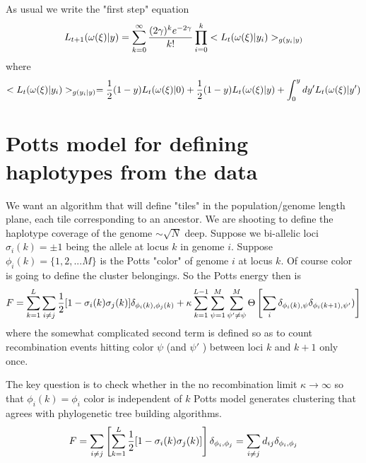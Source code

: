 \documentclass{article}
\begin{document}
As usual we write the "first step" equation
\begin{eqnarray}
L_{t+1}(\omega (\xi ) | y )=\sum_{k=0}^{\infty} {(2\gamma )^k e^{-2\gamma} \over k!} \prod_{i=0}^k <L_{t}(\omega (\xi ) | y_i )>_{g(y_i |y)}
\end{eqnarray}
where 
\begin{eqnarray}
 <L_{t}(\omega (\xi ) | y_i )>_{g(y_i |y)}={1 \over 2}(1-y) L_{t}(\omega (\xi ) | 0 )+{1 \over 2}(1-y) L_{t}(\omega (\xi ) | y )+\int_0^y dy' L_{t}(\omega (\xi ) | y' )
\end{eqnarray}

\section*{Potts model for defining haplotypes from the data}

We want an algorithm that will define "tiles" in the population/genome length plane, each tile corresponding to an ancestor. We are shooting to define the haplotype coverage of the genome $\sim \sqrt{N}$ deep. Suppose we bi-allelic loci $\sigma_i (k) =\pm 1$ being the allele at locus $k$ in genome $i$. Suppose $\phi_i (k)=\{ 1, 2,... M \}$ is the Potts "color" of genome $i$ at locus $k$. Of course color is going to define the cluster belongings. So the Potts energy then is
\begin{eqnarray}
 F= \sum_{k=1}^L \sum_{i \neq j} { 1 \over 2} [ 1-\sigma_i (k) \sigma_j (k) ] \delta_{\phi_i (k), \phi_j (k)} + \kappa \sum_{k=1}^{L-1} \sum_{\psi =1}^M \sum_{\psi' \neq \psi }^M\Theta \left [ \sum_{i }  \delta_{\phi_i (k), \psi}\delta_{\phi_i (k+1), \psi '} )\right ]
\end{eqnarray}
where the somewhat complicated second term is defined so as to count recombination events hitting color $\psi$ (and $\psi '$ ) between loci $k$ and $k+1$ only once.

The key question is to check whether in the no recombination limit $\kappa \rightarrow \infty$ so that $\phi_i (k) = \phi_i $ color is independent of $k$ Potts model generates clustering that agrees with phylogenetic tree building algorithms.
\begin{eqnarray}
 F=  \sum_{i \neq j} \left [ \sum_{k=1}^L{ 1 \over 2} [ 1-\sigma_i (k) \sigma_j (k)] \right ] \delta_{\phi_i , \phi_j } = \sum_{i \neq j} d_{ij} \delta_{\phi_i , \phi_j } 
\end{eqnarray}
\end{document}
